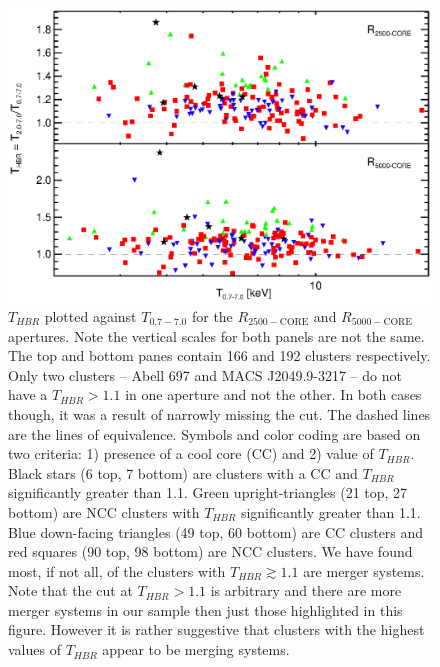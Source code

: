 \documentclass[12pt,preprint]{aastex}
\begin{document}
\clearpage
\begin{figure}
\begin{center}
\includegraphics*[width=\textwidth, trim=15mm 10mm 0mm 0mm, clip]{f8.eps}
\caption{
$T_{HBR}$ plotted against $T_{0.7-7.0}$ for the
$R_{2500-\mathrm{CORE}}$ and $R_{5000-\mathrm{CORE}}$ apertures. Note
the vertical scales for both panels are not the same. The top and
bottom panes contain 166 and 192 clusters respectively. Only two
clusters -- Abell 697 and MACS J2049.9-3217 -- do not have a $T_{HBR}
> 1.1$ in one aperture and not the other. In both cases though, it was
a result of narrowly missing the cut. The dashed lines are the lines
of equivalence. Symbols and color coding are based on two criteria: 1)
presence of a cool core (CC) and 2) value of $T_{HBR}$. Black stars (6
top, 7 bottom) are clusters with a CC and $T_{HBR}$ significantly
greater than 1.1. Green upright-triangles (21 top, 27 bottom) are NCC
clusters with $T_{HBR}$ significantly greater than 1.1. Blue
down-facing triangles (49 top, 60 bottom) are CC clusters and red
squares (90 top, 98 bottom) are NCC clusters. We have found most, if
not all, of the clusters with $T_{HBR} \gtrsim 1.1$ are merger
systems. Note that the cut at $T_{HBR} > 1.1$ is arbitrary and there
are more merger systems in our sample then just those highlighted in
this figure. However it is rather suggestive that clusters with the
highest values of $T_{HBR}$ appear to be merging systems.
}
\label{fig:ftx_tx}
\end{center}
\end{figure}
\clearpage
\end{document}
